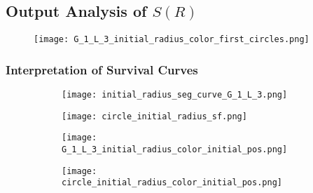 

\subsection{Output Analysis of $S(R)$}


     

     \begin{figure}
        \centering
          \texttt{[image: G\_1\_L\_3\_initial\_radius\_color\_first\_circles.png]}
          \caption{}
          \label{fig:G_1_L_3_first_circles}
      \end{figure}


    \subsubsection{Interpretation of Survival Curves}

     \begin{figure}
        \centering
        \begin{subfigure}[b]{0.45\textwidth}
          \texttt{[image: initial\_radius\_seg\_curve\_G\_1\_L\_3.png]}
          \caption{}
          \label{fig:G_1_L_3_radius_sf}
        \end{subfigure}
        \hfill
        \begin{subfigure}[b]{0.45\textwidth}
          \texttt{[image: circle\_initial\_radius\_sf.png]}
          \caption{}
          \label{fig:circle_radius_sf}
        \end{subfigure}
        \caption{}
        \label{fig:shape_sf_radius}
     \end{figure}


     \begin{figure}
        \centering
        \begin{subfigure}[b]{0.45\textwidth}
          \texttt{[image: G\_1\_L\_3\_initial\_radius\_color\_initial\_pos.png]}
          \caption{}
          \label{fig:G_1_L_3_radius_initial_pos}
        \end{subfigure}
        \hfill
        \begin{subfigure}[b]{0.45\textwidth}
          \texttt{[image: circle\_initial\_radius\_color\_initial\_pos.png]}
          \caption{}
          \label{fig:circle_radius_initial_pos}
        \end{subfigure}
        \caption{}
        \label{fig:radius_initial_pos}
     \end{figure}

